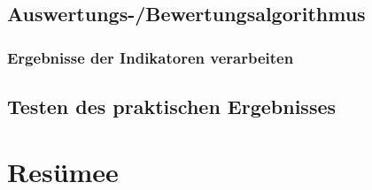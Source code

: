 \documentclass[12pt]{article}
\begin{document}
\subsection{Auswertungs-/Bewertungsalgorithmus}
	\subsubsection{Ergebnisse der Indikatoren verarbeiten}
\subsection{Testen des praktischen Ergebnisses}
\section{Resümee}



\nocite{*}
\printbibliography[heading=bibintoc,title=Literaturverzeichnis,notkeyword={picture}]
\printbibliography[heading=bibintoc,title=Bildverzeichnis,keyword={picture}]
\end{document}
